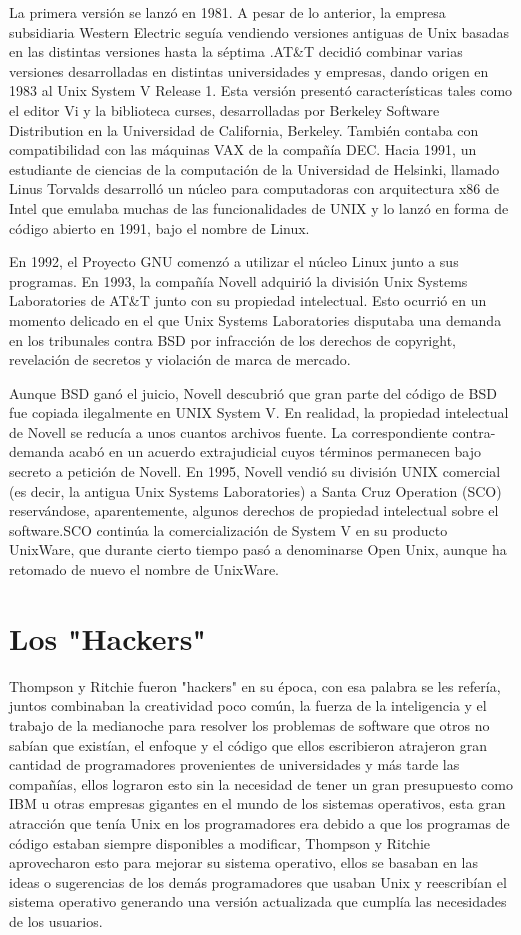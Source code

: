 La primera versión se lanzó en 1981. A pesar de lo anterior, la empresa subsidiaria Western Electric seguía vendiendo versiones antiguas de Unix basadas en las distintas 
versiones hasta la séptima .AT\&T decidió combinar varias versiones desarrolladas en distintas universidades y empresas, dando origen en 1983 al Unix System V Release 1. Esta 
versión presentó características tales como el editor Vi y la biblioteca curses, desarrolladas por Berkeley Software Distribution en la Universidad de California, Berkeley. 
También contaba con compatibilidad con las máquinas VAX de la compañía DEC. Hacia 1991, un estudiante de ciencias de la computación de la Universidad de Helsinki, llamado Linus 
Torvalds desarrolló un núcleo para computadoras con arquitectura x86 de Intel que emulaba muchas de las funcionalidades de UNIX y lo lanzó en forma de código abierto en 1991, 
bajo el nombre de Linux.
 
En 1992, el Proyecto GNU comenzó a utilizar el núcleo Linux junto a sus programas. En 1993, la compañía Novell adquirió la división Unix Systems Laboratories de AT\&T junto con 
su propiedad intelectual. Esto ocurrió en un momento delicado en el que Unix Systems Laboratories disputaba una demanda en los tribunales contra BSD por infracción de los 
derechos de copyright, revelación de secretos y violación de marca de mercado.
 
Aunque BSD ganó el juicio, Novell descubrió que gran parte del código de BSD fue copiada ilegalmente en UNIX System V. En realidad, la propiedad intelectual de Novell se reducía 
a unos cuantos archivos fuente. La correspondiente contra-demanda acabó en un acuerdo extrajudicial cuyos términos permanecen bajo secreto a petición de Novell. En 1995, Novell 
vendió su división UNIX comercial (es decir, la antigua Unix Systems Laboratories) a Santa Cruz Operation (SCO) reservándose, aparentemente, algunos derechos de propiedad 
intelectual sobre el software.SCO continúa la comercialización de System V en su producto UnixWare, que durante cierto tiempo pasó a denominarse Open Unix, aunque ha retomado de 
nuevo el nombre de UnixWare.

\section*{Los "Hackers"}
Thompson y Ritchie fueron "hackers" en su época, con esa palabra se les refería, juntos combinaban la creatividad poco común, la fuerza de la inteligencia y el trabajo de 
la medianoche para resolver los problemas de software que otros no sabían que existían, el enfoque y el código que ellos escribieron atrajeron gran cantidad de 
programadores provenientes de universidades y más tarde las  compañías, ellos lograron esto sin la necesidad de tener un gran presupuesto como IBM u otras empresas 
gigantes en el mundo de los sistemas operativos,  esta gran atracción que tenía Unix en los programadores era debido a que los programas de código estaban siempre  
disponibles a modificar, Thompson y Ritchie aprovecharon esto para mejorar su sistema operativo, ellos se basaban en las ideas o sugerencias de los demás programadores que 
usaban Unix y reescribían el sistema operativo generando una versión actualizada que cumplía las necesidades de los usuarios.


